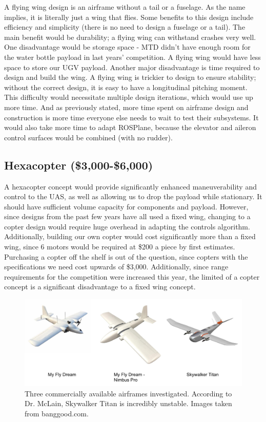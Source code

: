 \documentclass[]{auvsi_doc}
\begin{document}
	A flying wing design is an airframe without a tail or a fuselage. As the name implies, it is literally just a wing that flies. Some benefits to this design include efficiency and simplicity (there is no need to design a fuselage or a tail). The main benefit would be durability; a flying wing can withstand crashes very well. One disadvantage would be storage space - MTD didn't have enough room for the water bottle payload in last years' competition. A flying wing would have less space to store our UGV payload. Another major disadvantage is time required to design and build the wing. A flying wing is trickier to design to ensure stability; without the correct design, it is easy to have a longitudinal pitching moment. This difficulty would necessitate multiple design iterations, which would use up more time. And as previously stated, more time spent on airframe design and construction is more time everyone else needs to wait to test their subsystems. It would also take more time to adapt ROSPlane, because the elevator and aileron control surfaces would be combined (with no rudder).

\subsection*{Hexacopter (\$3,000-\$6,000)}

A hexacopter concept would provide significantly enhanced maneuverability and control to the UAS, as well as allowing us to drop the payload while stationary. It should have sufficient volume capacity for components and payload. However, since designs from the past few years have all used a fixed wing, changing to a copter design would require huge overhead in adapting the controls algorithm. Additionally, building our own copter would cost significantly more than a fixed wing, since 6 motors would be required at \$200 a piece by first estimates. Purchasing a copter off the shelf is out of the question, since copters with the specifications we need cost upwards of \$3,000. Additionally, since range requirements for the competition were increased this year, the limited of a copter concept is a significant disadvantage to a fixed wing concept.

\begin{figure}[h!]
	\centering
	\includegraphics[scale=0.5]{Planes1}
	\caption{Three commercially available airframes investigated. According to Dr. McLain, Skywalker Titan is incredibly unstable. Images taken from banggood.com.}
	\label{planes1}	
\end{figure}
\end{document}
